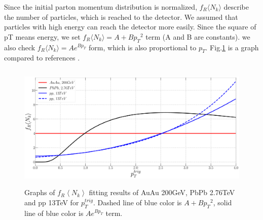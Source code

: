 \documentclass[12pt]{article}
\begin{document}



Since the initial parton momentum distribution is normalized, $f_R \langle N_k \rangle$ describe the number of particles,
which is reached to the detector.
We assumed that particles with high energy can reach the detector more easily.
Since the square of pT means energy, we set $f_R \langle N_k \rangle = A+B{p_T}^2$ term (A and B are constants).
we also check $f_R \langle N_k \rangle = Ae^{Bp_T}$ form, which is also proportional to $p_T$.
Fig.\ref{figure:frnk} is a graph compared to references \cite{Wong_1, PbPb}.


\begin{figure}[ht]
\centering
\includegraphics[width=12cm, height=6cm]{Paper_frnk}
\caption{Graphs of $f_R \left\langle N_k \right\rangle$ fitting results of AuAu 200GeV, PbPb 2.76TeV and pp 13TeV for $p_{T}^{trig}$.
Dashed line of blue color is $A+B{p_T}^2$, solid line of blue color is $Ae^{Bp_T}$ term.}
\label{figure:frnk}
\end{figure}
\end{document}
